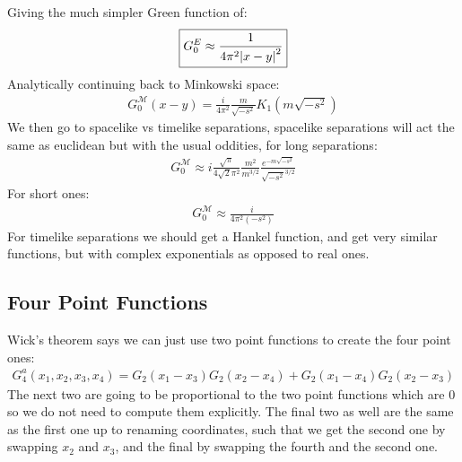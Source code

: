 \documentclass[12pt]{article}
\begin{document}
Giving the much simpler Green function of:
\begin{align*}
  \boxed{G_0^E\approx\frac{1}{4\pi^2\abs{x-y}^2}}
\end{align*}
Analytically continuing back to Minkowski space:
\begin{align*}
  G_0^{\mathcal{M}}(x-y)=\frac{i}{4\pi^2}\frac{m}{\sqrt{-s^2}}K_1(m\sqrt{-s^2})
\end{align*}
We then go to spacelike vs timelike separations, spacelike separations will act the same as euclidean but with the usual oddities, for long separations:
\begin{align*}
  \boxed{G_0^{\mathcal{M}}\approx i\frac{\sqrt{\pi}}{4\sqrt{2}\pi^2}
    \frac{m^2}{m^{3/2}}\frac{e^{-m\sqrt{-s^2}}}{\sqrt{-s^2}^{3/2}}}
\end{align*}
For short ones:
\begin{align*}
  \boxed{G_0^{\mathcal{M}}\approx\frac{i}{4\pi^2(-s^2)}}
\end{align*}
For timelike separations we should get a Hankel function, and get very similar functions, but with complex exponentials as opposed to real ones.
\subsection{Four Point Functions}
Wick's theorem says we can just use two point functions to create the four point ones:
\begin{align*}
  G^a_4(x_1,x_2,x_3,x_4)=G_2(x_1-x_3)G_2(x_2-x_4)+G_2(x_1-x_4)G_2(x_2-x_3)
\end{align*}
The next two are going to be proportional to the two point functions which are $0$ so we do not need to compute them explicitly. The final two as well are the same as the first one up to renaming coordinates, such that we get the second one by swapping $x_2$ and $x_3$, and the final by swapping the fourth and the second one.
\end{document}
